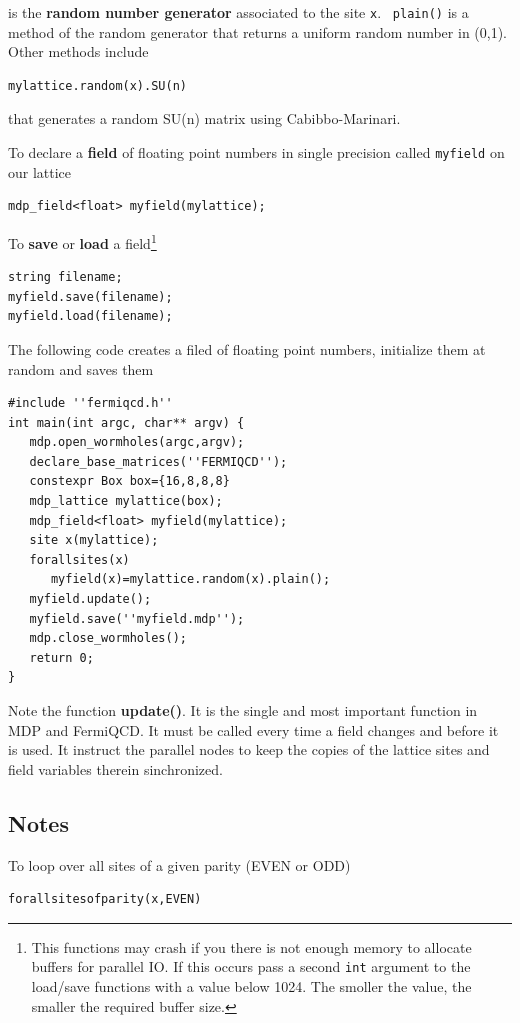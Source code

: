 is the {\bf random number generator} associated to the site {\tt x}. {\tt %
plain()} is a method of the random generator that returns a uniform random
number in (0,1). Other methods include
\begin{verbatim}
mylattice.random(x).SU(n)
\end{verbatim}

that generates a random SU(n) matrix using Cabibbo-Marinari.

To declare a {\bf field} of floating point numbers in single precision
called {\tt myfield} on our lattice
\begin{verbatim}
mdp_field<float> myfield(mylattice);
\end{verbatim}

To {\bf save} or {\bf load} a field\footnote{%
This functions may crash if you there is not enough memory to allocate
buffers for parallel IO. If this occurs pass a second {\tt int} argument to
the load/save functions with a value below 1024. The smoller the value, the
smaller the required buffer size.}
\begin{verbatim}
string filename;
myfield.save(filename);
myfield.load(filename);
\end{verbatim}

The following code creates a filed of floating point numbers, initialize
them at random and saves them
\begin{verbatim}
#include ''fermiqcd.h''
int main(int argc, char** argv) {
   mdp.open_wormholes(argc,argv);
   declare_base_matrices(''FERMIQCD'');
   constexpr Box box={16,8,8,8}
   mdp_lattice mylattice(box);
   mdp_field<float> myfield(mylattice);
   site x(mylattice);
   forallsites(x)
      myfield(x)=mylattice.random(x).plain();
   myfield.update();
   myfield.save(''myfield.mdp'');
   mdp.close_wormholes();
   return 0;
}
\end{verbatim}

Note the function {\bf update()}. It is the single and most important
function in MDP and FermiQCD. It must be called every time a field changes
and before it is used. It instruct the parallel nodes to keep the copies of
the lattice sites and field variables therein sinchronized.

\subsection{Notes}

To loop over all sites of a given parity (EVEN or ODD)
\begin{verbatim}
forallsitesofparity(x,EVEN)
\end{verbatim}

